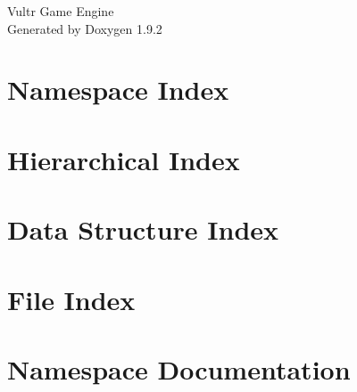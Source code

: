 \documentclass[twoside]{book}
\newcommand{\+}{\discretionary{\mbox{\scriptsize$\hookleftarrow$}}{}{}}
\newcommand{\clearemptydoublepage}{%
    \newpage{\pagestyle{empty}\cleardoublepage}%
  }
\begin{document}
  \raggedbottom
    \hypersetup{pageanchor=false,
                bookmarksnumbered=true,
                pdfencoding=unicode
               }
  \begin{titlepage}
  \vspace*{7cm}
  \begin{center}%
  {\Large Vultr Game Engine}\\
  \vspace*{1cm}
  {\large Generated by Doxygen 1.9.2}\\
  \end{center}
  \end{titlepage}
  \clearemptydoublepage
  \tableofcontents
  \clearemptydoublepage
  \hypersetup{pageanchor=true}
\chapter{Namespace Index}

\chapter{Hierarchical Index}

\chapter{Data Structure Index}

\chapter{File Index}

\chapter{Namespace Documentation}











\end{document}
